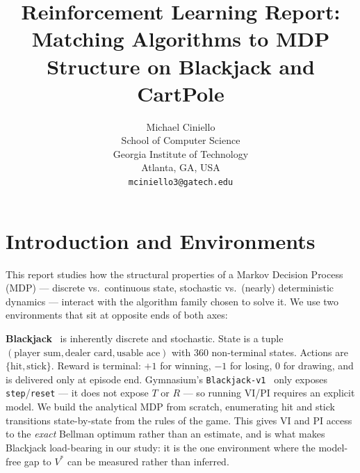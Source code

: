 \documentclass[conference]{IEEEtran}
\title{\LARGE \bf
Reinforcement Learning Report: \\
Matching Algorithms to MDP Structure on Blackjack and CartPole
}
\author{
\parbox{3in}{
\centering
Michael Ciniello \\
School of Computer Science \\
Georgia Institute of Technology \\
Atlanta, GA, USA \\
{\tt\small mciniello3@gatech.edu}
}
}
\begin{document}
\maketitle
\thispagestyle{empty}
\pagestyle{empty}


\section{Introduction and Environments}

This report studies how the structural properties of a Markov Decision
Process (MDP) --- discrete vs.\ continuous state, stochastic vs.\ (nearly)
deterministic dynamics --- interact with the algorithm family chosen to
solve it. We use two environments that sit at opposite ends of both axes:

\textbf{Blackjack}~\cite{sutton2018} is inherently discrete and stochastic.
State is a tuple $(\text{player sum}, \text{dealer card}, \text{usable ace})$
with 360 non-terminal states. Actions are
$\{\text{hit}, \text{stick}\}$. Reward is terminal: $+1$ for winning, $-1$
for losing, $0$ for drawing, and is delivered only at episode end.
Gymnasium's \texttt{Blackjack-v1}~\cite{gym_blackjack} only exposes
\texttt{step}/\texttt{reset} --- it does not expose $T$ or $R$ --- so
running VI/PI requires an explicit model. We build the analytical MDP
from scratch, enumerating hit and stick transitions state-by-state from
the rules of the game. This gives VI and PI access to the
\emph{exact} Bellman optimum rather than an estimate, and is what makes
Blackjack load-bearing in our study: it is the one environment where the
model-free gap to $V^*$ can be measured rather than inferred.
\end{document}
